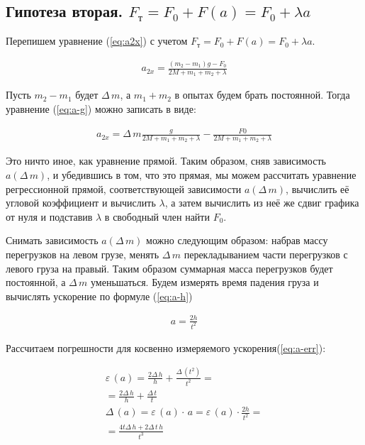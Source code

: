 
\subsection{Гипотеза вторая. $F_\text{т}=F_0+F(a)=F_0+\lambda{}a$}

Перепишем уравнение (\ref{eq:a2x}) с учетом $F_\text{т}=F_0+F(a)=F_0+\lambda{}a$. 

\begin{gather}
	\label{eq:a-g}
	a_{2x}=\frac{(m_2-m_1)g-F_0}{2M+m_1+m_2+\lambda}
\end{gather}

Пусть $m_2-m_1$ будет $\Delta\,m$, а $m_1+m_2$  в опытах будем брать постоянной. Тогда уравнение (\ref{eq:a-g}) можно записать в виде:

\begin{gather}
	\label{eq:a-dm}
	a_{2x}=\Delta\,m{}\frac{g}{2M+m_1+m_2+\lambda}-\frac{F0}{2M+m_1+m_2+\lambda}
\end{gather}

Это ничто иное, как уравнение прямой. Таким образом, сняв зависимость $a(\Delta\,m)$, и убедившись в том, что это прямая, мы можем рассчитать уравнение регрессионной прямой, соответствующей зависимости $a(\Delta\,m)$, вычислить её угловой коэффициент и вычислить $\lambda$, а затем вычислить из неё же сдвиг графика от нуля и подставив $\lambda$  в свободный член найти $F_0$.

Снимать зависимость $a(\Delta\,m)$ можно следующим образом: набрав массу перегрузков на левом грузе, менять $\Delta\,m$ перекладыванием части перегрузков с левого груза на правый. Таким образом суммарная масса перегрузков будет постоянной, а $\Delta\,m$ уменьшаться. Будем измерять время падения груза и вычислять ускорение по формуле (\ref{eq:a-h})

\begin{gather}
	\label{eq:a-h}
	a=\frac{2h}{t^2}
\end{gather}

Рассчитаем погрешности для косвенно измеряемого ускорения(\ref{eq:a-err}):

\begin{gather}
	\label{eq:a-err}
	\varepsilon\,(a)=\frac{2\Delta\,h}{h}+\frac{\Delta\,(t^2)}{t^2}=\\
	=\frac{2\Delta\,h}{h}+\frac{\Delta\,t}{t}\\
	\Delta\,(a)=\varepsilon\,(a)\cdot\,a=\varepsilon\,(a)\cdot\frac{2h}{t^2}=\\
	=\frac{4t\Delta\,h+2\Delta\,t\,h}{t^3}
\end{gather}

